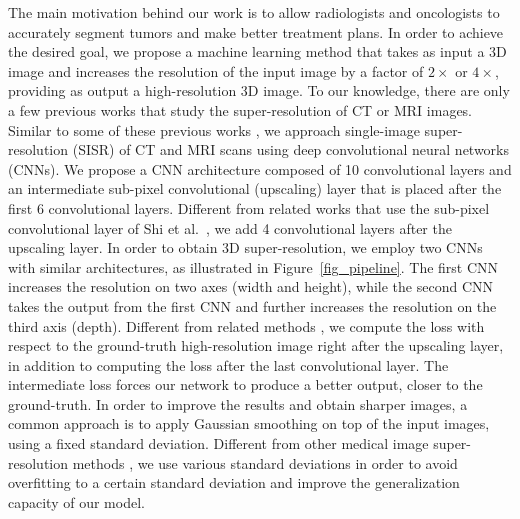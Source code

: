 \documentclass{ieeeaccess}
\begin{document}
The main motivation behind our work is to allow radiologists and oncologists to accurately segment tumors and make better treatment plans. In order to achieve the desired goal, we propose a machine learning method that takes as input a 3D image and increases the resolution of the input image by a factor of $2\times$ or $4\times$, providing as output a high-resolution 3D image. To our knowledge, there are only a few previous works \cite{Sert-MH-2019, Chen-MICCAI-2018, Du-AS-2019, Du-BIBM-2018, Du-NC-2019, Hatvani-TRPMS-2018, Hatvani-TMI-2018, Huang-CVPR-2017, Jurek-BBE-2019, Li-Access-2019, Mahapatra-CMIG-2019, Oktay-MICCAI-2016, Pham-CMIG-2019, Shi-JBHI-2018, You-TMI-2019, Yu-ICIP-2017, ZENG-CBM-2018, Zhao-TMI-2019} that study the super-resolution of CT or MRI images. Similar to some of these previous works \cite{Chen-MICCAI-2018, Du-AS-2019, Du-BIBM-2018, Du-NC-2019, Hatvani-TRPMS-2018, Hatvani-TMI-2018, Jurek-BBE-2019, Mahapatra-CMIG-2019, Oktay-MICCAI-2016, Pham-CMIG-2019, Shi-JBHI-2018, You-TMI-2019, Yu-ICIP-2017, ZENG-CBM-2018, Zhao-TMI-2019}, we approach single-image super-resolution (SISR) of CT and MRI scans using deep convolutional neural networks (CNNs). We propose a CNN architecture composed of 10 convolutional layers and an intermediate sub-pixel convolutional (upscaling) layer \cite{Shi-CVPR-2016} that is placed after the first 6 convolutional layers. Different from related works \cite{Du-AS-2019, Hatvani-TRPMS-2018, Yu-ICIP-2017, Zhao-TMI-2019} that use the sub-pixel convolutional layer of Shi et al.~\cite{Shi-CVPR-2016}, we add 4 convolutional layers after the upscaling layer. In order to obtain 3D super-resolution, we employ two CNNs with similar architectures, as illustrated in Figure~\ref{fig_pipeline}. The first CNN increases the resolution on two axes (width and height), while the second CNN takes the output from the first CNN and further increases the resolution on the third axis (depth). Different from related methods \cite{Du-AS-2019, Hatvani-TRPMS-2018, Yu-ICIP-2017, Zhao-TMI-2019}, we compute the loss with respect to the ground-truth high-resolution image right after the upscaling layer, in addition to computing the loss after the last convolutional layer. The intermediate loss forces our network to produce a better output, closer to the ground-truth. In order to improve the results and obtain sharper images, a common approach is to apply Gaussian smoothing on top of the input images, using a fixed standard deviation. Different from other medical image super-resolution methods \cite{Du-AS-2019, Shi-JBHI-2018, ZENG-CBM-2018}, we use various standard deviations in order to avoid overfitting to a certain standard deviation and improve the generalization capacity of our model.
\end{document}
